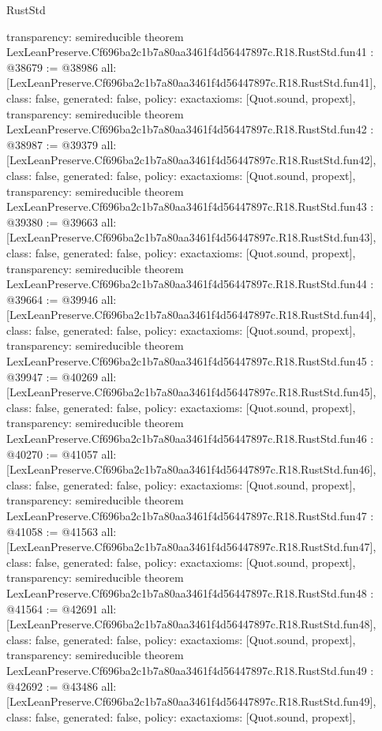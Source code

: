 \begin{lexlean}{RustStd}
\begin{coremodule}
{  transparency: semireducible
}
theorem LexLeanPreserve.Cf696ba2c1b7a80aa3461f4d56447897c.R18.RustStd.fun41 : @38679 := @38986 {
  all: [LexLeanPreserve.Cf696ba2c1b7a80aa3461f4d56447897c.R18.RustStd.fun41],
  class: false,
  generated: false,
  policy: exact{axioms: [Quot.sound, propext]},
  transparency: semireducible
}
theorem LexLeanPreserve.Cf696ba2c1b7a80aa3461f4d56447897c.R18.RustStd.fun42 : @38987 := @39379 {
  all: [LexLeanPreserve.Cf696ba2c1b7a80aa3461f4d56447897c.R18.RustStd.fun42],
  class: false,
  generated: false,
  policy: exact{axioms: [Quot.sound, propext]},
  transparency: semireducible
}
theorem LexLeanPreserve.Cf696ba2c1b7a80aa3461f4d56447897c.R18.RustStd.fun43 : @39380 := @39663 {
  all: [LexLeanPreserve.Cf696ba2c1b7a80aa3461f4d56447897c.R18.RustStd.fun43],
  class: false,
  generated: false,
  policy: exact{axioms: [Quot.sound, propext]},
  transparency: semireducible
}
theorem LexLeanPreserve.Cf696ba2c1b7a80aa3461f4d56447897c.R18.RustStd.fun44 : @39664 := @39946 {
  all: [LexLeanPreserve.Cf696ba2c1b7a80aa3461f4d56447897c.R18.RustStd.fun44],
  class: false,
  generated: false,
  policy: exact{axioms: [Quot.sound, propext]},
  transparency: semireducible
}
theorem LexLeanPreserve.Cf696ba2c1b7a80aa3461f4d56447897c.R18.RustStd.fun45 : @39947 := @40269 {
  all: [LexLeanPreserve.Cf696ba2c1b7a80aa3461f4d56447897c.R18.RustStd.fun45],
  class: false,
  generated: false,
  policy: exact{axioms: [Quot.sound, propext]},
  transparency: semireducible
}
theorem LexLeanPreserve.Cf696ba2c1b7a80aa3461f4d56447897c.R18.RustStd.fun46 : @40270 := @41057 {
  all: [LexLeanPreserve.Cf696ba2c1b7a80aa3461f4d56447897c.R18.RustStd.fun46],
  class: false,
  generated: false,
  policy: exact{axioms: [Quot.sound, propext]},
  transparency: semireducible
}
theorem LexLeanPreserve.Cf696ba2c1b7a80aa3461f4d56447897c.R18.RustStd.fun47 : @41058 := @41563 {
  all: [LexLeanPreserve.Cf696ba2c1b7a80aa3461f4d56447897c.R18.RustStd.fun47],
  class: false,
  generated: false,
  policy: exact{axioms: [Quot.sound, propext]},
  transparency: semireducible
}
theorem LexLeanPreserve.Cf696ba2c1b7a80aa3461f4d56447897c.R18.RustStd.fun48 : @41564 := @42691 {
  all: [LexLeanPreserve.Cf696ba2c1b7a80aa3461f4d56447897c.R18.RustStd.fun48],
  class: false,
  generated: false,
  policy: exact{axioms: [Quot.sound, propext]},
  transparency: semireducible
}
theorem LexLeanPreserve.Cf696ba2c1b7a80aa3461f4d56447897c.R18.RustStd.fun49 : @42692 := @43486 {
  all: [LexLeanPreserve.Cf696ba2c1b7a80aa3461f4d56447897c.R18.RustStd.fun49],
  class: false,
  generated: false,
  policy: exact{axioms: [Quot.sound, propext]},
}
\end{coremodule}
\end{lexlean}
